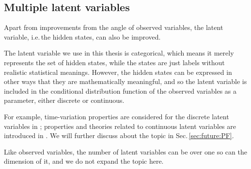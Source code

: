 \subsection{Multiple latent variables}
\label{sec:system:improvement:latent}
Apart from improvements from the angle of observed variables,
the latent variable, i.e.\,the hidden states, can also be improved.

The latent variable we use in this thesis is categorical,
which means it merely represents the set of hidden states,
while the states are just labels without realistic statistical meanings.
However, the hidden states can be expressed in other ways that 
they are mathematically meaningful,
and so the latent variable is included in the conditional distribution function of 
the observed variables as a parameter, either discrete or continuous.

For example, time-variation properties are considered for 
the discrete latent variables in \cite{Dias:2015ky};
properties and theories related to continuous latent variables 
are introduced in \cite{Creal:2012ct}.
We will further discuss about the topic in Sec.\,\ref{sec:future:PF}.

Like observed variables, the number of latent variables can be over one
so can the dimension of it, 
and we do not expand the topic here.


